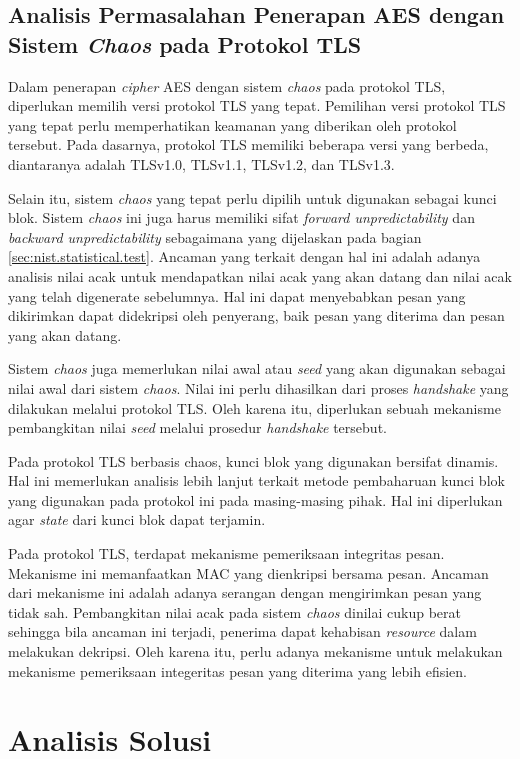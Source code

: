 \subsection{Analisis Permasalahan Penerapan AES dengan Sistem \emph{Chaos} pada Protokol TLS}
\label{sec:ancaman-implementasi}
Dalam penerapan \emph{cipher} AES dengan sistem \emph{chaos} pada protokol TLS, diperlukan memilih versi protokol TLS yang tepat. Pemilihan versi protokol TLS yang tepat perlu memperhatikan keamanan yang diberikan oleh protokol tersebut. Pada dasarnya, protokol TLS memiliki beberapa versi yang berbeda, diantaranya adalah TLSv1.0, TLSv1.1, TLSv1.2, dan TLSv1.3. 

Selain itu, sistem \emph{chaos} yang tepat perlu dipilih untuk digunakan sebagai kunci blok. Sistem \emph{chaos} ini juga harus memiliki sifat \emph{forward unpredictability} dan \emph{backward unpredictability} sebagaimana yang dijelaskan pada bagian \ref{sec:nist.statistical.test}. Ancaman yang terkait dengan hal ini adalah adanya analisis nilai acak untuk mendapatkan nilai acak yang akan datang dan nilai acak yang telah digenerate sebelumnya. Hal ini dapat menyebabkan pesan yang dikirimkan dapat didekripsi oleh penyerang, baik pesan yang diterima dan pesan yang akan datang.

Sistem \emph{chaos} juga memerlukan nilai awal atau \emph{seed} yang akan digunakan sebagai nilai awal dari sistem \emph{chaos}. Nilai ini perlu dihasilkan dari proses \emph{handshake} yang dilakukan melalui protokol TLS. Oleh karena itu, diperlukan sebuah mekanisme pembangkitan nilai \emph{seed} melalui prosedur \emph{handshake} tersebut.

Pada protokol TLS berbasis chaos, kunci blok yang digunakan bersifat dinamis. Hal ini memerlukan analisis lebih lanjut terkait metode pembaharuan kunci blok yang digunakan pada protokol ini pada masing-masing pihak. Hal ini diperlukan agar \emph{state} dari kunci blok dapat terjamin.

Pada protokol TLS, terdapat mekanisme pemeriksaan integritas pesan. Mekanisme ini memanfaatkan MAC yang dienkripsi bersama pesan. Ancaman dari mekanisme ini adalah adanya serangan dengan mengirimkan pesan yang tidak sah. Pembangkitan nilai acak pada sistem \emph{chaos} dinilai cukup berat sehingga bila ancaman ini terjadi, penerima dapat kehabisan \emph{resource} dalam melakukan dekripsi. Oleh karena itu, perlu adanya mekanisme untuk melakukan mekanisme pemeriksaan integeritas pesan yang diterima yang lebih efisien.

\section{Analisis Solusi}

